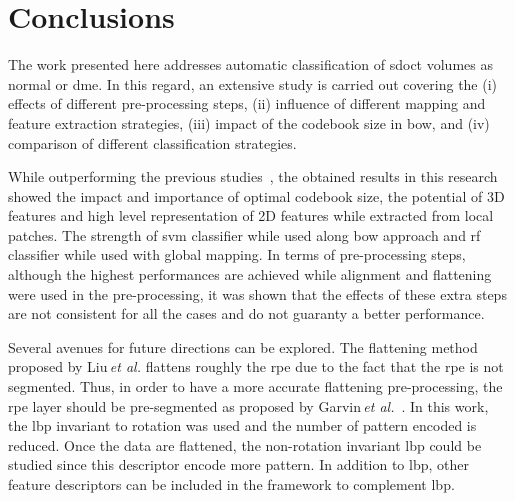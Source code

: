 \documentclass[review]{elsarticle}
\begin{document}
\maketitle

\linenumbers
\acresetall  %




%

\section{Conclusions}\label{sec:con}
The work presented here addresses automatic classification of \ac{sdoct} volumes as normal or \ac{dme}.
In this regard, an extensive study is carried out covering the
(i) effects of different pre-processing steps, 
(ii) influence of different mapping and feature extraction strategies,
(iii) impact of the codebook size in \ac{bow}, and
(iv) comparison of different classification strategies.

While outperforming the previous studies~\cite{Lemaintre2015miccaiOCT,Venhuizen2015}, the obtained results in this research showed the impact and importance of optimal codebook size, the potential of 3D features and high level representation of 2D features while extracted from local patches.
The strength of \ac{svm} classifier while used along \ac{bow} approach and \ac{rf} classifier while used with global mapping.
In terms of pre-processing steps, although the highest performances are achieved while alignment and flattening were used in the pre-processing, it was shown that the effects of these extra steps are not consistent for all the cases and do not guaranty a better performance.

Several avenues for future directions can be explored. The flattening method proposed by Liu\,\emph{et al.} flattens roughly the \ac{rpe} due to the fact that the \ac{rpe} is not segmented. Thus, in order to have a more accurate flattening pre-processing, the \ac{rpe} layer should be pre-segmented as proposed by Garvin\,\emph{et al.}~\cite{Garvin2009}. In this work, the \ac{lbp} invariant to rotation was used and the number of pattern encoded is reduced. Once the data are flattened, the non-rotation invariant \ac{lbp} could be studied since this descriptor encode more pattern. In addition to \ac{lbp}, other feature descriptors can be included in the framework to complement \ac{lbp}.
\end{document}

